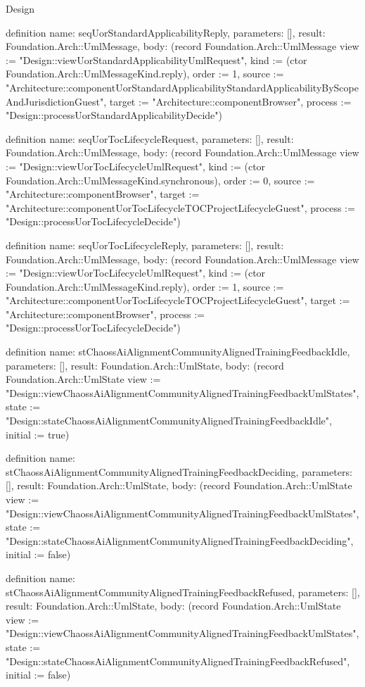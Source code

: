 \begin{lexlean}{Design}
\begin{semanticmodule}
definition{
  name: seqUorStandardApplicabilityReply,
  parameters: [],
  result: Foundation.Arch::UmlMessage,
  body: (record Foundation.Arch::UmlMessage {view := "Design::viewUorStandardApplicabilityUmlRequest", kind := (ctor Foundation.Arch::UmlMessageKind.reply), order := 1, source := "Architecture::componentUorStandardApplicabilityStandardApplicabilityByScopeAndJurisdictionGuest", target := "Architecture::componentBrowser", process := "Design::processUorStandardApplicabilityDecide"})
}

definition{
  name: seqUorTocLifecycleRequest,
  parameters: [],
  result: Foundation.Arch::UmlMessage,
  body: (record Foundation.Arch::UmlMessage {view := "Design::viewUorTocLifecycleUmlRequest", kind := (ctor Foundation.Arch::UmlMessageKind.synchronous), order := 0, source := "Architecture::componentBrowser", target := "Architecture::componentUorTocLifecycleTOCProjectLifecycleGuest", process := "Design::processUorTocLifecycleDecide"})
}

definition{
  name: seqUorTocLifecycleReply,
  parameters: [],
  result: Foundation.Arch::UmlMessage,
  body: (record Foundation.Arch::UmlMessage {view := "Design::viewUorTocLifecycleUmlRequest", kind := (ctor Foundation.Arch::UmlMessageKind.reply), order := 1, source := "Architecture::componentUorTocLifecycleTOCProjectLifecycleGuest", target := "Architecture::componentBrowser", process := "Design::processUorTocLifecycleDecide"})
}

definition{
  name: stChaossAiAlignmentCommunityAlignedTrainingFeedbackIdle,
  parameters: [],
  result: Foundation.Arch::UmlState,
  body: (record Foundation.Arch::UmlState {view := "Design::viewChaossAiAlignmentCommunityAlignedTrainingFeedbackUmlStates", state := "Design::stateChaossAiAlignmentCommunityAlignedTrainingFeedbackIdle", initial := true})
}

definition{
  name: stChaossAiAlignmentCommunityAlignedTrainingFeedbackDeciding,
  parameters: [],
  result: Foundation.Arch::UmlState,
  body: (record Foundation.Arch::UmlState {view := "Design::viewChaossAiAlignmentCommunityAlignedTrainingFeedbackUmlStates", state := "Design::stateChaossAiAlignmentCommunityAlignedTrainingFeedbackDeciding", initial := false})
}

definition{
  name: stChaossAiAlignmentCommunityAlignedTrainingFeedbackRefused,
  parameters: [],
  result: Foundation.Arch::UmlState,
  body: (record Foundation.Arch::UmlState {view := "Design::viewChaossAiAlignmentCommunityAlignedTrainingFeedbackUmlStates", state := "Design::stateChaossAiAlignmentCommunityAlignedTrainingFeedbackRefused", initial := false})
}


\end{semanticmodule}
\end{lexlean}
